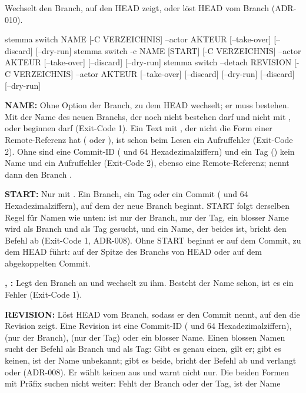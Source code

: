 Wechselt den Branch, auf den HEAD zeigt, oder löst HEAD vom Branch (ADR-010).

\starttyping
stemma switch NAME [-C VERZEICHNIS] --actor AKTEUR [--take-over] [--discard]
    [--dry-run]
stemma switch -c NAME [START] [-C VERZEICHNIS] --actor AKTEUR [--take-over]
    [--discard] [--dry-run]
stemma switch --detach REVISION [-C VERZEICHNIS] --actor AKTEUR [--take-over]
    [--discard] [--dry-run]
    [--discard] [--dry-run]
\stoptyping

\startitemize
\item {\bf NAME:} Ohne Option der Branch, zu dem HEAD wechselt; er muss bestehen.
Mit  der Name des neuen Branchs, der noch nicht bestehen darf
und nicht mit ,  oder  beginnen darf (Exit-Code 1).
Ein Text mit , der nicht die Form einer Remote-Referenz hat
( oder ),
ist schon beim Lesen ein Aufruffehler (Exit-Code 2).
Ohne  sind eine Commit-ID ( und 64 Hexadezimalziffern) und ein Tag
() kein Name und ein Aufruffehler (Exit-Code 2), ebenso eine Remote-Referenz;
 nennt dann den Branch .
\item {\bf START:} Nur mit . Ein Branch, ein Tag oder ein Commit ( und 64
Hexadezimalziffern), auf dem der neue Branch beginnt. START folgt derselben Regel für Namen wie
 unten:  ist nur der Branch,  nur der Tag,
ein blosser Name wird als Branch und als Tag gesucht, und ein Name, der beides ist, bricht den
Befehl ab (Exit-Code 1, ADR-008). Ohne START beginnt er auf dem Commit,
zu dem HEAD führt: auf der Spitze des Branchs von HEAD oder auf dem abgekoppelten Commit.
\item {\bf {}, :} Legt den Branch an und wechselt zu ihm.
Besteht der Name schon, ist es ein Fehler (Exit-Code 1).
\item {\bf {} REVISION:} Löst HEAD vom Branch, sodass er den Commit nennt,
auf den die Revision zeigt. Eine Revision ist eine Commit-ID ( und 64
Hexadezimalziffern),  (nur der Branch),  (nur der Tag) oder ein
blosser Name. Einen blossen Namen sucht der Befehl als Branch und als Tag: Gibt es genau einen,
gilt er; gibt es keinen, ist der Name unbekannt; gibt es beide, bricht der Befehl ab und verlangt
 oder  (ADR-008). Er wählt keinen aus und warnt nicht nur.
Die beiden Formen mit Präfix suchen nicht weiter: Fehlt der Branch oder der Tag, ist der Name
